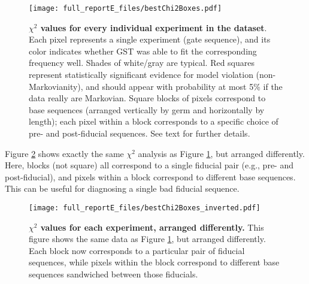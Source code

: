\documentclass{article}[11pt]
\begin{document}
{\begin{figure}
\begin{center}
\texttt{[image: full\_reportE\_files/bestChi2Boxes.pdf]}
\caption{\textbf{$\chi^2$ values for every individual experiment in the dataset}.  Each pixel represents a single experiment (gate sequence), and its color indicates whether GST was able to fit the corresponding frequency well.  Shades of white/gray are typical. Red squares represent statistically significant evidence for model violation (non-Markovianity), and should appear with probability at most 5\% if the data really are Markovian. Square blocks of pixels correspond to base sequences (arranged vertically by germ and horizontally by length); each pixel within a block corresponds to a specific choice of pre- and post-fiducial sequences.  See text for further details.\label{bestEstimateColorBoxPlot}}
\end{center}
\end{figure}

Figure \ref{invertedBestEstimateColorBoxPlot} shows exactly the same $\chi^2$ analysis as Figure \ref{bestEstimateColorBoxPlot}, but arranged differently.  Here, blocks (not square) all correspond to a single fiducial pair (e.g., pre- and post-fiducial), and pixels within a block correspond to different base sequences.  This can be useful for diagnosing a single bad fiducial sequence.

\begin{figure}
\begin{center}
\texttt{[image: full\_reportE\_files/bestChi2Boxes\_inverted.pdf]}
\caption{\textbf{$\chi^2$ values for each experiment, arranged differently.}  This figure shows the same data as Figure \ref{bestEstimateColorBoxPlot}, but arranged differently.  Each block now corresponds to a particular pair of fiducial sequences, while pixels within the block correspond to different base sequences sandwiched between those fiducials.\label{invertedBestEstimateColorBoxPlot}}
\end{center}
\end{figure}

}{}


\end{document}
